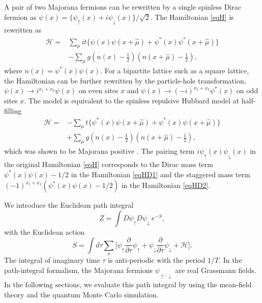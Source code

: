 \documentclass[aps,prb,superscriptaddress,twocolumn]{revtex4-1}
\newcommand{\up}{\uparrow}
\newcommand{\down}{\downarrow}
\begin{document}
A pair of two Majorana fermions can be rewritten by a single spinless Dirac fermion as $\psi(x) = \{\psi_\up(x) +i\psi_\down(x) \}/\sqrt{2}$.
The Hamiltonian \eqref{eqH} is rewritten as
\begin{equation}
\begin{split}
 \mathcal{H}
=& \sum_\mu it \{ \psi(x) \psi(x+\hat{\mu}) + \psi^*(x) \psi^*(x+\hat{\mu}) \}
\\
&- \sum_\mu g \left(n(x)-\frac{1}{2}\right) \left(n(x+\hat{\mu}) -\frac{1}{2}\right)
,
\end{split}
\label{eqHD1}
\end{equation}
where $n(x)=\psi^*(x) \psi(x)$.
For a bipartite lattice such as a square lattice, the Hamiltonian can be further rewritten by the particle-hole transformation, $\psi(x) \to i^{x_1+x_2} \psi(x)$ on even sites $x$ and $\psi(x) \to (-i)^{x_1+x_2} \psi^*(x)$ on odd sites $x$.
The model is equivalent to the spinless repulsive Hubbard model at half-filling\cite{PhysRevB.29.5253,PhysRevB.32.103}
\begin{equation}
\begin{split}
 \mathcal{H}
=& - \sum_\mu t \{ \psi^*(x) \psi(x+\hat{\mu}) + \psi^*(x) \psi(x+\hat{\mu}) \}
\\
&+ \sum_\mu g \left(n(x)-\frac{1}{2}\right) \left(n(x+\hat{\mu}) -\frac{1}{2}\right)
,
\end{split}
\label{eqHD2}
\end{equation}
which was shown to be Majorana positive \cite{2015PhRvB..91x1117L}.
The pairing term $i \psi_\uparrow(x) \psi_\downarrow(x)$ in the original Hamiltonian \eqref{eqH} corresponds to the Dirac mass term $\psi^*(x)\psi(x)-1/2$ in the Hamiltonian \eqref{eqHD1} and the staggered mass term $(-1)^{x_1+x_2} \left(\psi^*(x) \psi(x)-1/2\right)$ in the Hamiltonian \eqref{eqHD2}.

We introduce the Euclidean path integral
\begin{equation}
 Z = \int D\psi_\uparrow D\psi_\downarrow \ e^{-S} ,
\end{equation}
with the Euclidean action
\begin{equation}
 S
= \int d\tau \sum_x \bigg[
\psi_\uparrow \frac{\partial}{\partial\tau} \psi_\uparrow + \psi_\downarrow  \frac{\partial}{\partial\tau} \psi_\downarrow
+ \mathcal{H} \bigg]
.
\end{equation}
The integral of imaginary time $\tau$ is anti-periodic with the period $1/T$.
In the path-integral formalism, the Majorana fermions $\psi_{\up,\down}$ are real Grassmann fields.
In the following sections, we evaluate this path integral by using the mean-field theory and the quantum Monte Carlo simulation.
\end{document}
